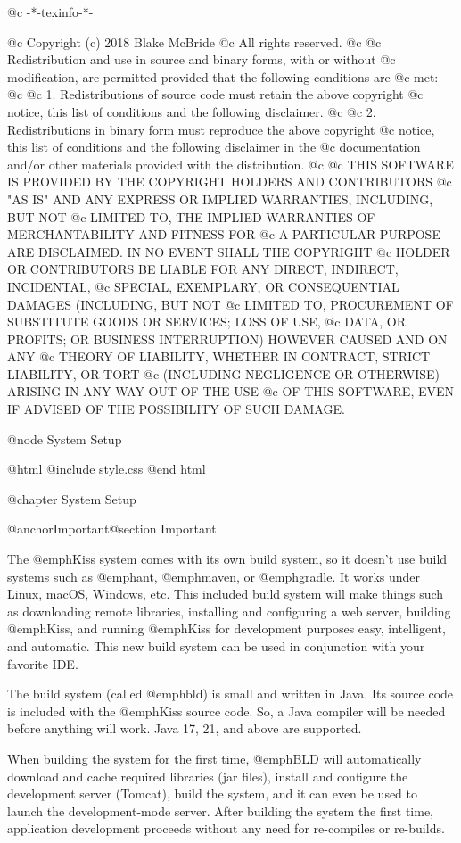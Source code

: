 @c -*-texinfo-*-

@c  Copyright (c) 2018 Blake McBride
@c  All rights reserved.
@c
@c  Redistribution and use in source and binary forms, with or without
@c  modification, are permitted provided that the following conditions are
@c  met:
@c
@c  1. Redistributions of source code must retain the above copyright
@c  notice, this list of conditions and the following disclaimer.
@c
@c  2. Redistributions in binary form must reproduce the above copyright
@c  notice, this list of conditions and the following disclaimer in the
@c  documentation and/or other materials provided with the distribution.
@c
@c  THIS SOFTWARE IS PROVIDED BY THE COPYRIGHT HOLDERS AND CONTRIBUTORS
@c  "AS IS" AND ANY EXPRESS OR IMPLIED WARRANTIES, INCLUDING, BUT NOT
@c  LIMITED TO, THE IMPLIED WARRANTIES OF MERCHANTABILITY AND FITNESS FOR
@c  A PARTICULAR PURPOSE ARE DISCLAIMED. IN NO EVENT SHALL THE COPYRIGHT
@c  HOLDER OR CONTRIBUTORS BE LIABLE FOR ANY DIRECT, INDIRECT, INCIDENTAL,
@c  SPECIAL, EXEMPLARY, OR CONSEQUENTIAL DAMAGES (INCLUDING, BUT NOT
@c  LIMITED TO, PROCUREMENT OF SUBSTITUTE GOODS OR SERVICES; LOSS OF USE,
@c  DATA, OR PROFITS; OR BUSINESS INTERRUPTION) HOWEVER CAUSED AND ON ANY
@c  THEORY OF LIABILITY, WHETHER IN CONTRACT, STRICT LIABILITY, OR TORT
@c  (INCLUDING NEGLIGENCE OR OTHERWISE) ARISING IN ANY WAY OUT OF THE USE
@c  OF THIS SOFTWARE, EVEN IF ADVISED OF THE POSSIBILITY OF SUCH DAMAGE.


@node System Setup

@html
@include style.css
@end html

@chapter System Setup

@anchor{Important}@section Important

The @emph{Kiss} system comes with its own build system, so it doesn't
use build systems such as @emph{ant}, @emph{maven}, or @emph{gradle}.
It works under Linux, macOS, Windows, etc. This included build system
will make things such as downloading remote libraries, installing and
configuring a web server, building @emph{Kiss}, and running
@emph{Kiss} for development purposes easy, intelligent, and automatic.
This new build system can be used in conjunction with your favorite IDE.

The build system (called @emph{bld}) is small and written in Java.
Its source code is included with the @emph{Kiss} source code.  So, a
Java compiler will be needed before anything will work.  
Java 17, 21, and above are supported.

When building the system for the first time, @emph{BLD} will
automatically download and cache required libraries (jar files), install and
configure the development server (Tomcat), build the system, and it
can even be used to launch the development-mode server.  After building
the system the first time, application development proceeds without
any need for re-compiles or re-builds.

